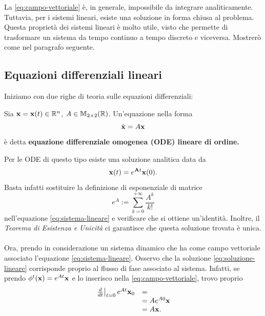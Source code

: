 La \eqref{eq:campo-vettoriale} è, in generale, impossibile da integrare analiticamente.
Tuttavia, per i sistemi lineari, esiste una soluzione in forma chiusa al problema.
Questa proprietà dei sistemi lineari è molto utile, visto che permette di trasformare un sistema
da tempo continuo a tempo discreto e viceversa.
Mostrerò come nel paragrafo seguente.


\subsection{Equazioni differenziali lineari}
\label{subsec:equazioni-differenziali-lineari}
Iniziamo con due righe di teoria sulle equazioni differenziali:

\begin{definition}
    Sia $\mathbf{x} = \mathbf{x}(t) \in \mathbb{R}^n$, $A \in \mathbb{M}_{2\times 2}(\mathbb{R})$. Un'equazione nella forma
    \begin{equation}
        \dot{\mathbf{x}} = A \mathbf{x}
        \label{eq:sistema-lineare}
    \end{equation}
    è detta \textbf{equazione differenziale omogenea (\textsc{ODE}) lineare di  ordine.}
    \label{def:sistema-lineare}
\end{definition}

Per le ODE di questo tipo esiste una soluzione analitica data da
\begin{equation}
    \mathbf{x}(t) = e^{\mathbf{A} t} \mathbf{x}(0).
    \label{eq:soluzione-lineare}
\end{equation}
Basta infatti sostituire la definizione di esponenziale di matrice
\begin{equation}
    e^{A} := \sum_{k=0}^{+\infty} \frac{A^k}{k!}
    \label{eq:exp-matrice}
\end{equation}
nell'equazione \eqref{eq:sistema-lineare} e verificare che si ottiene un'identità.
Inoltre, il \emph{Teorema di Esistenza e Unicità} ci garantisce che questa soluzione
trovata è unica.

\paragraph{}
Ora, prendo in considerazione un sistema dinamico che ha come campo vettoriale associato
l'equazione \eqref{eq:sistema-lineare}. Osservo che la soluzione \eqref{eq:soluzione-lineare}
corrisponde proprio al flusso di fase associato al sistema. Infatti, se prendo
$\phi^t(\mathbf{x}) = e^{At} \mathbf{x}$ e lo inserisco nella \eqref{eq:campo-vettoriale},
trovo proprio
\begin{equation*}
    \begin{array}{ll}
        \left. \frac d{dt} \right|_{t=0} e^{At} \mathbf{x}_0 &= \\
        &= A e^{A0} \mathbf{x}  \\
        &= A \mathbf{x}.
    \end{array}
\end{equation*}

